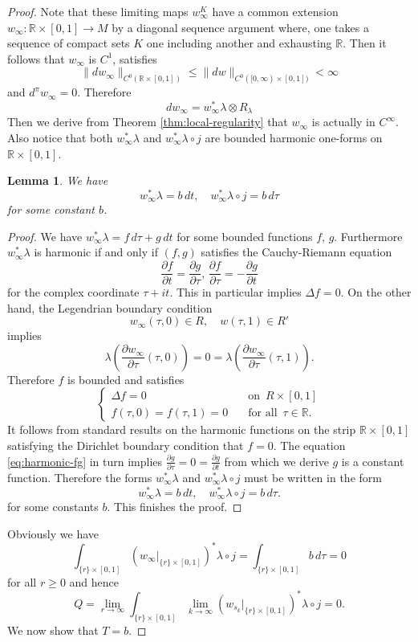 \documentclass[reqno]{amsart}
\def\R{\ifmmode{\mathbb R}\else{$\mathbb R$}\fi} %
\newcommand{\del}{\partial}
\newcommand{\be}{\begin{equation}}
\newcommand{\ee}{\end{equation}}
\theoremstyle{theorem}
\newtheorem{lem}[thm]{Lemma}
\theoremstyle{definition}
\numberwithin{equation}{section}
\def\R{{\mathbb R}}
\def\R{{\mathbb R}}
\def\R{\ifmmode{\mathbb R}\else{$\mathbb R$}\fi} %
\def\R{{\mathbb R}}
\def\R{{\mathbb R}}
\begin{document}
\begin{proof}
Note that these limiting maps $w^K_\infty$ have a common extension $w_\infty: \R\times [0,1]\to M$
by a  diagonal sequence argument where, one takes a sequence of compact sets $K$ one including another and exhausting $\R$.
Then it follows that  $w_\infty$ is $C^1$,  satisfies
$$
\|d w_\infty\|_{C^0(\R\times [0,1])}\leq \|d w\|_{C^0([0, \infty)\times [0,1])}<\infty
$$
and $d^\pi w_\infty = 0$. Therefore
$$
dw_\infty=w_\infty^*\lambda \otimes R_\lambda
$$
Then we derive from Theorem \ref{thm:local-regularity} that $w_\infty$ is actually in $C^\infty$.
Also notice that both $w_\infty^*\lambda$ and $w_\infty^*\lambda\circ j$ are bounded harmonic one-forms on $\R\times [0,1]$.
\begin{lem} We have
$$
w_\infty^*\lambda= b\,dt, \quad w_\infty^*\lambda\circ j=b\,d\tau
$$
for some constant $b$.
\end{lem}
\begin{proof}
We have $w_\infty^*\lambda = f\,d\tau + g \, dt$ for some bounded functions $f, \, g$.
Furthermore $w_\infty^*\lambda$ is harmonic if and only if $(f,g)$ satisfies the Cauchy-Riemann equation
\be\label{eq:harmonic-fg}
\frac{\del f}{\del t} = \frac{\del g}{\del \tau}, \, \frac{\del f}{\del \tau} = - \frac{\del g}{\del t}
\ee
for the complex coordinate $\tau + it$.
This in particular implies $\Delta f = 0$. On the other hand,
the Legendrian boundary condition
$$
w_\infty(\tau,0) \in R, \quad w(\tau,1) \in R'
$$
implies
\be\label{eq:Q=0}
\lambda\left(\frac{\del w_\infty}{\del \tau}(\tau,0)\right) = 0 = \lambda\left(\frac{\del w_\infty}{\del \tau}(\tau,1)\right).
\ee
Therefore $f$ is bounded and satisfies
$$
\begin{cases}
\Delta f = 0 \quad &\text{on }\, R \times [0,1]\\
f(\tau,0) = f(\tau,1) = 0 \quad &\text{for all }\, \tau \in \R.
\end{cases}
$$
It follows from standard results on the harmonic functions on the strip $\R \times [0,1]$
satisfying the Dirichlet boundary condition that $f = 0$.
The equation \eqref{eq:harmonic-fg} in turn implies $\frac{\del g}{\del \tau} = 0 = \frac{\del g}{\del t}$
from which we derive $g$ is a constant function.
Therefore the forms $w_\infty^*\lambda$ and $w_\infty^*\lambda\circ j$  must be written in  the form
$$
w_\infty^*\lambda= b\,dt, \quad w_\infty^*\lambda\circ j=b\,d\tau.
$$
for some constants $b$. This finishes the proof.
\end{proof}

Obviously we have
$$
\int_{\{r\}\times [0,1]}(w_\infty|_{\{r\}\times [0,1]})^*\lambda\circ j = \int_{\{r\} \times [0,1]}b\, d\tau = 0
$$
for all $r \geq 0$ and hence
$$
Q =  \lim_{r \to  \infty} \int_{\{r\}\times [0,1]}\lim_{k\to \infty}(w_{s_k}|_{\{r\}\times [0,1]})^*\lambda\circ j
= 0.
$$
We now show that $T = b$.


\end{proof}
\end{document}
